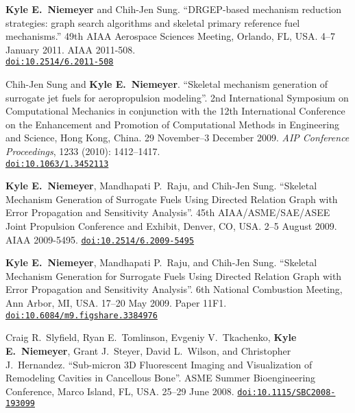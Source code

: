 \documentclass[margin,line,11pt]{res}
\makeatletter
\newlength{\bibhang}
\newlength{\bibsep}
 {\@listi \global\bibsep\itemsep \global\advance\bibsep by\parsep}
\newenvironment{bibenum*}
  {\renewcommand\labelenumi{\theenumi.}%
   \etaremune[
     topsep=0pt,
     itemsep=\bibsep,
     parsep=0pt,partopsep=0pt,
     itemindent=-\bibhang,
     leftmargin={\bibhang+\widthof{[999]}}]}
  {\endetaremune}
\newcommand*{\doi}[1]{\href{http://dx.doi.org/#1}{\nolinkurl{doi:#1}}}
\makeatother
\begin{document}
\begin{resume}
\begin{bibenum*}
\item \textbf{Kyle E.\ Niemeyer} and Chih-Jen Sung.
``DRGEP-based mechanism reduction strategies: graph search algorithms and skeletal primary reference fuel mechanisms.''
49th AIAA Aero\-space Sciences Meeting, Orlando, FL, USA.
4--7 January 2011.
AIAA 2011-508. \\
\doi{10.2514/6.2011-508}

\item Chih-Jen Sung and \textbf{Kyle E.\ Niemeyer}.
``Skeletal mechanism generation of surrogate jet fuels for aeropropulsion modeling''.
2nd International Symposium on Computational Mechanics in conjunction with the 12th International Conference on the Enhancement and Promotion of Computational Methods in Engineering and Science, Hong Kong, China.
29 November--3 December 2009.
\emph{AIP Conference Proceedings}, 1233 (2010): 1412--1417. \\
\doi{10.1063/1.3452113}


\item \textbf{Kyle E.\ Niemeyer}, Mandhapati P.\ Raju, and Chih-Jen Sung.
``Skeletal Mechanism Generation of Surrogate Fuels Using Directed Relation Graph with Error Propagation and Sensitivity Analysis''.
45th AIAA\slash ASME\slash SAE\slash ASEE Joint Propulsion Conference and Exhibit, Denver, CO, USA.
2--5 August 2009.
AIAA 2009-5495.
\doi{10.2514/6.2009-5495}

\item \textbf{Kyle E.\ Niemeyer}, Mandhapati P.\ Raju, and Chih-Jen Sung.
``Skeletal Mechanism Generation for Surrogate Fuels Using Directed Relation Graph with Error Propagation and Sensitivity Analysis''.
6th National Combustion Meeting, Ann Arbor, MI, USA.
17--20 May 2009.
Paper 11F1.
\doi{10.6084/m9.figshare.3384976}

\item Craig R.\ Slyfield, Ryan E.\ Tomlinson,  Evgeniy V.\ Tkachenko, \textbf{Kyle E.\ Niemeyer}, Grant J.\ Steyer, David L.\ Wilson, and Christopher J.\ Hernandez.
``Sub-micron 3D Fluorescent Imaging and Visualization of Remodeling Cavities in Cancellous Bone''.
ASME Summer Bioengineering Conference, Marco Island, FL, USA.
25--29 June 2008.
\doi{10.1115/SBC2008-193099}

\end{bibenum*}


\end{resume}
\end{document}
